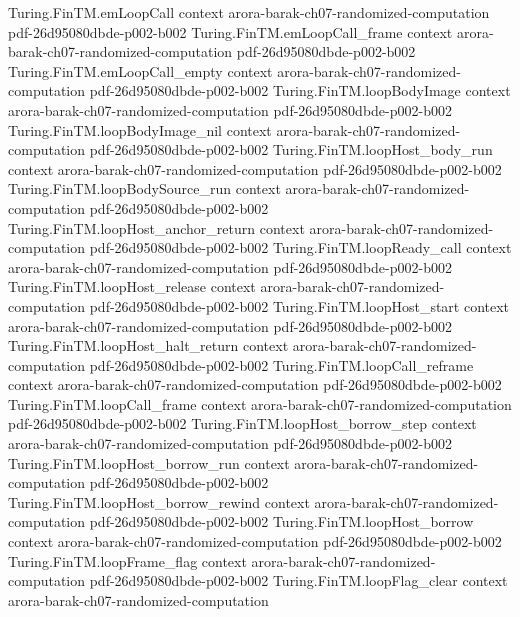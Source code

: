 \begin{theorem}
\proofstep
  {Turing.FinTM.emLoopCall}
  {context}
  {arora-barak-ch07-randomized-computation}
  {pdf-26d95080dbde-p002-b002}
\proofstep
  {Turing.FinTM.emLoopCall_frame}
  {context}
  {arora-barak-ch07-randomized-computation}
  {pdf-26d95080dbde-p002-b002}
\proofstep
  {Turing.FinTM.emLoopCall_empty}
  {context}
  {arora-barak-ch07-randomized-computation}
  {pdf-26d95080dbde-p002-b002}
\proofstep
  {Turing.FinTM.loopBodyImage}
  {context}
  {arora-barak-ch07-randomized-computation}
  {pdf-26d95080dbde-p002-b002}
\proofstep
  {Turing.FinTM.loopBodyImage_nil}
  {context}
  {arora-barak-ch07-randomized-computation}
  {pdf-26d95080dbde-p002-b002}
\proofstep
  {Turing.FinTM.loopHost_body_run}
  {context}
  {arora-barak-ch07-randomized-computation}
  {pdf-26d95080dbde-p002-b002}
\proofstep
  {Turing.FinTM.loopBodySource_run}
  {context}
  {arora-barak-ch07-randomized-computation}
  {pdf-26d95080dbde-p002-b002}
\proofstep
  {Turing.FinTM.loopHost_anchor_return}
  {context}
  {arora-barak-ch07-randomized-computation}
  {pdf-26d95080dbde-p002-b002}
\proofstep
  {Turing.FinTM.loopReady_call}
  {context}
  {arora-barak-ch07-randomized-computation}
  {pdf-26d95080dbde-p002-b002}
\proofstep
  {Turing.FinTM.loopHost_release}
  {context}
  {arora-barak-ch07-randomized-computation}
  {pdf-26d95080dbde-p002-b002}
\proofstep
  {Turing.FinTM.loopHost_start}
  {context}
  {arora-barak-ch07-randomized-computation}
  {pdf-26d95080dbde-p002-b002}
\proofstep
  {Turing.FinTM.loopHost_halt_return}
  {context}
  {arora-barak-ch07-randomized-computation}
  {pdf-26d95080dbde-p002-b002}
\proofstep
  {Turing.FinTM.loopCall_reframe}
  {context}
  {arora-barak-ch07-randomized-computation}
  {pdf-26d95080dbde-p002-b002}
\proofstep
  {Turing.FinTM.loopCall_frame}
  {context}
  {arora-barak-ch07-randomized-computation}
  {pdf-26d95080dbde-p002-b002}
\proofstep
  {Turing.FinTM.loopHost_borrow_step}
  {context}
  {arora-barak-ch07-randomized-computation}
  {pdf-26d95080dbde-p002-b002}
\proofstep
  {Turing.FinTM.loopHost_borrow_run}
  {context}
  {arora-barak-ch07-randomized-computation}
  {pdf-26d95080dbde-p002-b002}
\proofstep
  {Turing.FinTM.loopHost_borrow_rewind}
  {context}
  {arora-barak-ch07-randomized-computation}
  {pdf-26d95080dbde-p002-b002}
\proofstep
  {Turing.FinTM.loopHost_borrow}
  {context}
  {arora-barak-ch07-randomized-computation}
  {pdf-26d95080dbde-p002-b002}
\proofstep
  {Turing.FinTM.loopFrame_flag}
  {context}
  {arora-barak-ch07-randomized-computation}
  {pdf-26d95080dbde-p002-b002}
\proofstep
  {Turing.FinTM.loopFlag_clear}
  {context}
  {arora-barak-ch07-randomized-computation}

\end{theorem}
